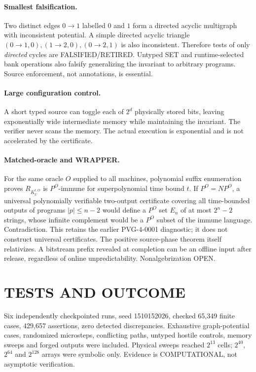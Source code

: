 \documentclass{article}
\begin{document}
\paragraph{Smallest falsification.}
Two distinct edges $0\to1$ labelled $0$ and $1$ form a directed acyclic multigraph with inconsistent potential. A simple directed acyclic triangle $(0\to1,0),(1\to2,0),(0\to2,1)$ is also inconsistent. Therefore tests of only \emph{directed} cycles are FALSIFIED/RETIRED. Untyped SET and runtime-selected bank operations also falsify generalizing the invariant to arbitrary programs. Source enforcement, not annotations, is essential.

\paragraph{Large configuration control.}
A short typed source can toggle each of $2^d$ physically stored bits, leaving exponentially wide intermediate memory while maintaining the invariant. The verifier never scans the memory. The actual execution is exponential and is not accelerated by the certificate.

\paragraph{Matched-oracle and WRAPPER.}
For the same oracle $O$ supplied to all machines, polynomial suffix enumeration proves $R_{K_U^{t,O}}$ is $P^O$-immune for superpolynomial time bound $t$. If $P^O=NP^O$, a universal polynomially verifiable two-output certificate covering all time-bounded outputs of programs $|p|\le n-2$ would define a $P^O$ set $E_n$ of at most $2^n-2$ strings, whose infinite complement would be a $P^O$ subset of the immune language. Contradiction. This retains the earlier PVG-4-0001 diagnostic; it does not construct universal certificates. The positive source-phase theorem itself relativizes. A bitstream prefix revealed at completion can be an offline input after release, regardless of online unpredictability. Nonalgebrization OPEN.

\section{TESTS AND OUTCOME}
Six independently checkpointed runs, seed 1510152026, checked 65,349 finite cases, 429,657 assertions, zero detected discrepancies. Exhaustive graph-potential cases, randomized microsteps, conflicting paths, untyped hostile controls, memory sweeps and forged outputs were included. Physical sweeps reached $2^{13}$ cells; $2^{40}$, $2^{64}$ and $2^{128}$ arrays were symbolic only. Evidence is COMPUTATIONAL, not asymptotic verification.
\end{document}
